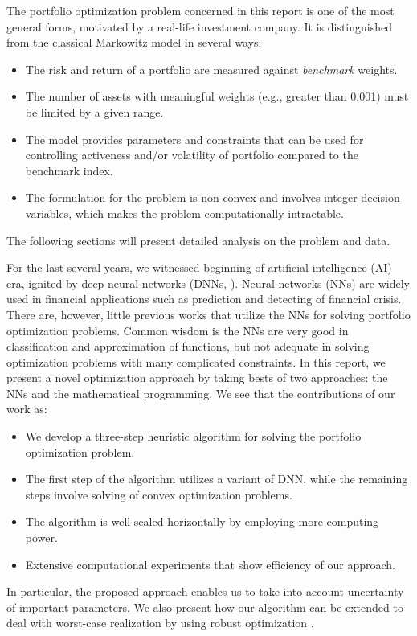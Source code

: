 \documentclass[11pt]{article}
\begin{document}
The portfolio optimization problem concerned in this report is one of the most general forms, motivated by a real-life investment company. It is distinguished from the classical Markowitz model in several ways:
\begin{itemize}
\item The risk and return of a portfolio are measured against \emph{benchmark} weights.
\item The number of assets with meaningful weights (e.g., greater than 0.001) must be limited by a given range.
\item The model provides parameters and constraints that can be used for controlling activeness and/or volatility of portfolio compared to the benchmark index.
\item The formulation for the problem is non-convex and involves integer decision variables, which makes the problem computationally intractable.
\end{itemize}
The following sections will present detailed analysis on the problem and data.

For the last several years, we witnessed beginning of artificial intelligence (AI) era, ignited by deep neural networks (DNNs, \cite{lecun2015deep}). Neural networks (NNs) are widely used in financial applications such as prediction and detecting of financial crisis. There are, however, little previous works that utilize the NNs for solving portfolio optimization problems. Common wisdom is the NNs are very good in classification and approximation of functions, but not adequate in solving optimization problems with many complicated constraints. In this report, we present a novel optimization approach by taking bests of two approaches: the NNs and the mathematical programming. We see that the contributions of our work as:
\begin{itemize}
\item We develop a three-step heuristic algorithm for solving the portfolio optimization problem.
\item The first step of the algorithm utilizes a variant of DNN, while the remaining steps involve solving of convex optimization problems.
\item The algorithm is well-scaled horizontally by employing more computing power.
\item Extensive computational experiments that show efficiency of our approach.
\end{itemize}
 
In particular, the proposed approach enables us to take into account uncertainty of important parameters. We also present how our algorithm can be extended to deal with worst-case realization by using robust optimization \citep{bertsimas2004price}. 
\end{document}
